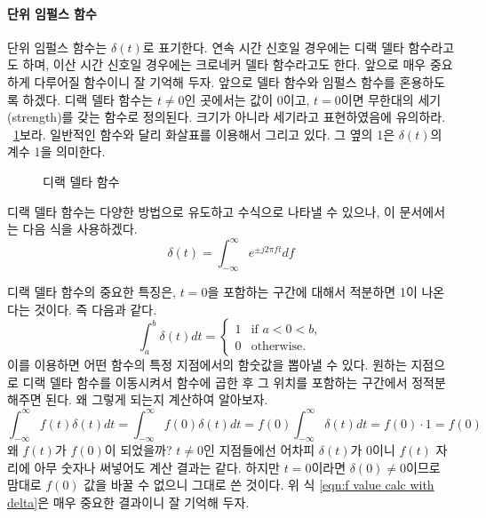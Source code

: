 \paragraph{단위 임펄스 함수} 
단위 임펄스 함수는 $\delta (t)$로 표기한다. 연속 시간 신호일 경우에는 디랙 델타 함수라고도 하며, 이산 시간 신호일 경우에는 크로네커 델타 함수라고도 한다.
앞으로 매우 중요하게 다루어질 함수이니 잘 기억해 두자. 앞으로 델타 함수와 임펄스 함수를 혼용하도록 하겠다.
디랙 델타 함수는 $t\neq0$인 곳에서는 값이 $0$이고, $t=0$이면 무한대의 세기(strength)를 갖는 함수로 정의된다. 크기가 아니라 세기라고 표현하였음에 유의하라.
\figurename~\ref{fig:dirac}\을 보라. 일반적인 함수와 달리 화살표를 이용해서 그리고 있다. 그 옆의 1은 $\delta(t)$의 계수 1을 의미한다.
\begin{figure}[!hbp]
    \centering
    \caption{디랙 델타 함수}\label{fig:dirac}
\end{figure}
\par
디랙 델타 함수는 다양한 방법으로 유도하고 수식으로 나타낼 수 있으나, 이 문서에서는 다음 식을 사용하겠다.
\begin{equation}
    \delta (t)=\int_{-\infty}^{\infty}e^{\pm j2\pi ft}df\label{eqn:def of delta}
\end{equation}
\par
디랙 델타 함수의 중요한 특징은, $t=0$을 포함하는 구간에 대해서 적분하면 1이 나온다는 것이다.
즉 다음과 같다.
\begin{equation}
    \int_{a}^{b} \delta (t) dt = \begin{cases}
        1 & \text{if } a < 0 < b,\\
        0 & \text{otherwise.}
    \end{cases}
\end{equation}
이를 이용하면 어떤 함수의 특정 지점에서의 함숫값을 뽑아낼 수 있다. 원하는 지점으로 디랙 델타 함수를 이동시켜서 함수에 곱한 후 그 위치를 포함하는 구간에서 정적분해주면 된다.
왜 그렇게 되는지 계산하여 알아보자.
\begin{equation}
    \int_{-\infty}^{\infty}f(t)\delta(t)dt=\int_{-\infty}^{\infty}f(0)\delta(t)dt=f(0)\int_{-\infty}^{\infty}\delta(t)dt=f(0)\cdot 1 = f(0) \label{eqn:f value calc with delta}
\end{equation}
왜 $f(t)$가 $f(0)$이 되었을까? $t\neq0$인 지점들에선 어차피 $\delta(t)$가 0이니 $f(t)$ 자리에 아무 숫자나 써넣어도 계산 결과는 같다.
하지만 $t=0$이라면 $\delta(0)\neq0$이므로 맘대로 $f(0)$ 값을 바꿀 수 없으니 그대로 쓴 것이다.
위 식 \ref{eqn:f value calc with delta}은 매우 중요한 결과이니 잘 기억해 두자. 
